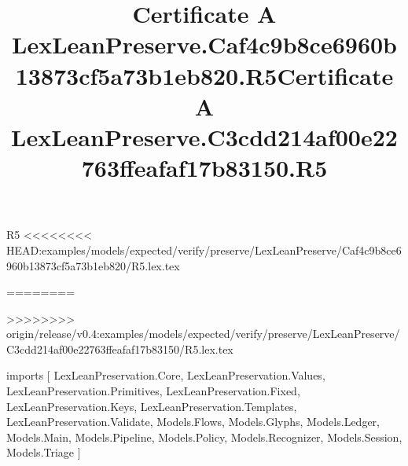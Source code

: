 \begin{lexlean}{R5}
<<<<<<<< HEAD:examples/models/expected/verify/preserve/LexLeanPreserve/Caf4c9b8ce6960b13873cf5a73b1eb820/R5.lex.tex
\title{Certificate A LexLeanPreserve.Caf4c9b8ce6960b13873cf5a73b1eb820.R5}
========
\title{Certificate A LexLeanPreserve.C3cdd214af00e22763ffeafaf17b83150.R5}
>>>>>>>> origin/release/v0.4:examples/models/expected/verify/preserve/LexLeanPreserve/C3cdd214af00e22763ffeafaf17b83150/R5.lex.tex
\begin{coremodule}
imports [
  LexLeanPreservation.Core,
  LexLeanPreservation.Values,
  LexLeanPreservation.Primitives,
  LexLeanPreservation.Fixed,
  LexLeanPreservation.Keys,
  LexLeanPreservation.Templates,
  LexLeanPreservation.Validate,
  Models.Flows,
  Models.Glyphs,
  Models.Ledger,
  Models.Main,
  Models.Pipeline,
  Models.Policy,
  Models.Recognizer,
  Models.Session,
  Models.Triage
]


\end{coremodule}
\end{lexlean}
